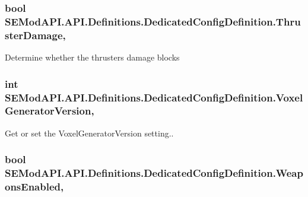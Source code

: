 \subsubsection[{Thruster\+Damage}]{\setlength{\rightskip}{0pt plus 5cm}bool S\+E\+Mod\+A\+P\+I.\+A\+P\+I.\+Definitions.\+Dedicated\+Config\+Definition.\+Thruster\+Damage\hspace{0.3cm}{\ttfamily [get]}, {\ttfamily [set]}}\label{class_s_e_mod_a_p_i_1_1_a_p_i_1_1_definitions_1_1_dedicated_config_definition_a82b0bf83777c3f0871d45c2574a2ce7e}


Determine whether the thrusters damage blocks 

\hypertarget{class_s_e_mod_a_p_i_1_1_a_p_i_1_1_definitions_1_1_dedicated_config_definition_a1615f62022bb9b538a0cabb29f466ee2}{}
\subsubsection[{Voxel\+Generator\+Version}]{\setlength{\rightskip}{0pt plus 5cm}int S\+E\+Mod\+A\+P\+I.\+A\+P\+I.\+Definitions.\+Dedicated\+Config\+Definition.\+Voxel\+Generator\+Version\hspace{0.3cm}{\ttfamily [get]}, {\ttfamily [set]}}\label{class_s_e_mod_a_p_i_1_1_a_p_i_1_1_definitions_1_1_dedicated_config_definition_a1615f62022bb9b538a0cabb29f466ee2}


Get or set the Voxel\+Generator\+Version setting.. 

\hypertarget{class_s_e_mod_a_p_i_1_1_a_p_i_1_1_definitions_1_1_dedicated_config_definition_a15c3e4f5822d24b2bda9fa6143ce2b4f}{}
\subsubsection[{Weapons\+Enabled}]{\setlength{\rightskip}{0pt plus 5cm}bool S\+E\+Mod\+A\+P\+I.\+A\+P\+I.\+Definitions.\+Dedicated\+Config\+Definition.\+Weapons\+Enabled\hspace{0.3cm}{\ttfamily [get]}, {\ttfamily [set]}}\label{class_s_e_mod_a_p_i_1_1_a_p_i_1_1_definitions_1_1_dedicated_config_definition_a15c3e4f5822d24b2bda9fa6143ce2b4f}


